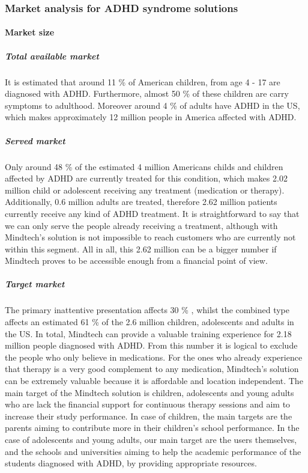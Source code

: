 \documentclass[letterpaper,10pt]{article}
\begin{document}
\subsubsection{Market analysis for ADHD syndrome solutions}
\paragraph{Market size}

\subparagraph{Total available market} It is estimated that around 11 \% of American children, from age 4 - 17 are diagnosed with ADHD. Furthermore, almost 50 \% of these children are carry symptoms to adulthood. Moreover around 4 \% of adults have ADHD in the US, which makes approximately 12 million people in America affected with ADHD. \cite{market_ADHD}

\subparagraph{Served market} Only around 48 \% of the estimated 4 million Americans childs and children affected by ADHD are currently treated for this condition, which makes 2.02 million child or adolescent receiving any treatment (medication or therapy). Additionally, 0.6 million adults are treated, therefore 2.62 million patients currently receive any kind of ADHD treatment. \cite{market_ADHD} It is straightforward to say that we can only serve the people already receiving a treatment, although with Mindtech's solution is not impossible to reach customers who are currently not within this segment. All in all, this 2.62 million can be a bigger number if Mindtech proves to be accessible enough from a financial point of view. 

\subparagraph{Target market} 
The primary inattentive presentation affects 30 \% , whilst the combined type affects an estimated 61 \% of the 2.6 million children, adolescents and adults in the US. In total, Mindtech can provide a valuable training experience for 2.18 million people diagnosed with ADHD. From this number it is logical to exclude the people who only believe in medications. For the ones who already experience that therapy is a very good complement to any medication, Mindtech's solution can be extremely valuable because it is affordable and location independent. 
The main target of the Mindtech solution is children, adolescents and young adults who are lack the financial support for continuous therapy sessions and aim to increase their study performance. In case of  children, the main targets are the parents aiming to contribute more in their children's school performance. In the case of adolescents and young adults, our main target are the users themselves, and the schools and universities aiming to help the academic performance of the students diagnosed with ADHD, by providing appropriate resources. 
\end{document}
